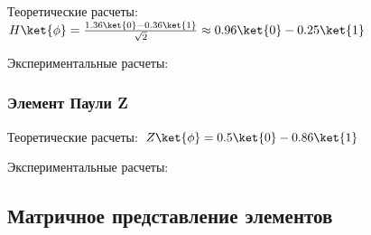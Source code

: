\documentclass{article}
\begin{document}
Теоретические расчеты: $H\ket{\phi} =
\frac{1.36\ket{0}-0.36\ket{1}}{\sqrt{2}}\approx 0.96\ket{0}-0.25\ket{1}$
 
Экспериментальные расчеты:
 
\begin{figure}[H]
\end{figure}
 
\subsubsection{Элемент Паули Z}
 
Теоретические расчеты: $Z\ket{\phi} = 0.5\ket{0}-0.86\ket{1}$
 
Экспериментальные расчеты:

\begin{figure}[H]
\end{figure}

\subsection{Матричное представление элементов}
\end{document}
